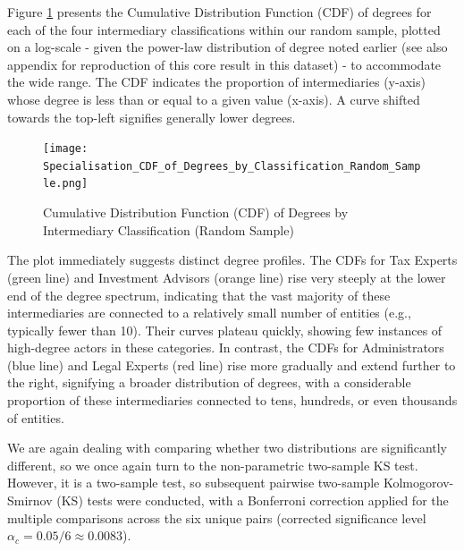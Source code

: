 Figure \ref{fig:specialisation_cdf_degrees} presents the Cumulative Distribution Function (CDF) of degrees for each of the four intermediary classifications within our random sample, plotted on a log-scale - given the power-law distribution of degree noted earlier (see also appendix for reproduction of this core result in this dataset) - to accommodate the wide range. The CDF indicates the proportion of intermediaries (y-axis) whose degree is less than or equal to a given value (x-axis). A curve shifted towards the top-left signifies generally lower degrees.

\begin{figure}[htbp]
    \centering
    \texttt{[image: Specialisation\_CDF\_of\_Degrees\_by\_Classification\_Random\_Sample.png]}
    \caption{Cumulative Distribution Function (CDF) of Degrees by Intermediary Classification (Random Sample)}
    \label{fig:specialisation_cdf_degrees}
\end{figure}

The plot immediately suggests distinct degree profiles. The CDFs for Tax Experts (green line) and Investment Advisors (orange line) rise very steeply at the lower end of the degree spectrum, indicating that the vast majority of these intermediaries are connected to a relatively small number of entities (e.g., typically fewer than 10). Their curves plateau quickly, showing few instances of high-degree actors in these categories. In contrast, the CDFs for Administrators (blue line) and Legal Experts (red line) rise more gradually and extend further to the right, signifying a broader distribution of degrees, with a considerable proportion of these intermediaries connected to tens, hundreds, or even thousands of entities.

We are again dealing with comparing whether two distributions are significantly different, so we once again turn to the non-parametric two-sample KS test. However, it is a two-sample test, so subsequent pairwise two-sample Kolmogorov-Smirnov (KS) tests were conducted, with a Bonferroni correction applied for the multiple comparisons across the six unique pairs (corrected significance level $\alpha_c = 0.05/6 \approx 0.0083$).  

